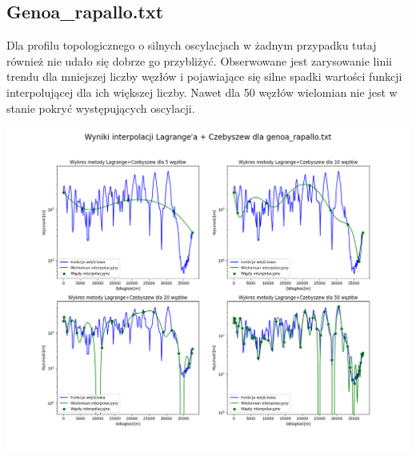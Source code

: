 \documentclass[a4paper,12pt]{article}
\begin{document}
   	\subsection{Genoa\_rapallo.txt}
	Dla profilu topologicznego o silnych oscylacjach w żadnym przypadku tutaj również nie udało się dobrze go przybliżyć. Obserwowane jest zarysowanie linii trendu dla mniejszej liczby węzłów i pojawiające się silne spadki wartości funkcji interpolującej dla ich większej liczby. Nawet dla 50 węzłów wielomian nie jest w stanie pokryć występujących oscylacji.
	\begin{center}
        \includegraphics[scale=0.4]{../charts/chebyshev_genoa_rapallo.png}
    \end{center}
    
    \newpage
\end{document}
